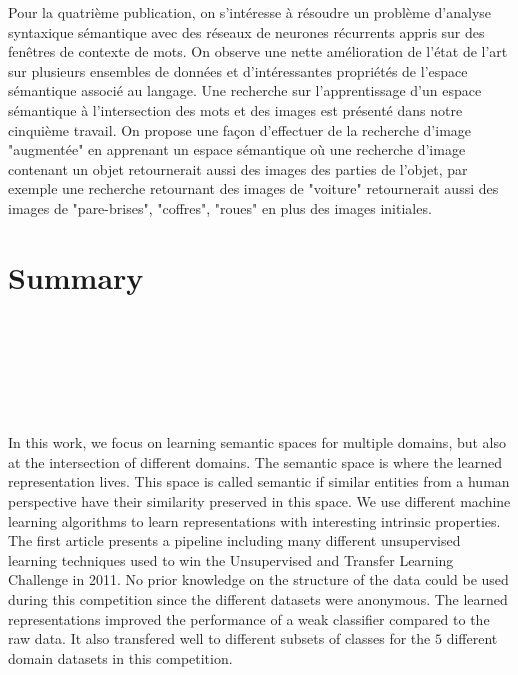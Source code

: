 \vspace{-0.2cm}
Pour la quatrième publication, on s'intéresse à résoudre un problème d'analyse
syntaxique sémantique avec des réseaux de neurones récurrents appris sur des
fenêtres de contexte de mots.  On observe une nette amélioration de l'état de
l'art sur plusieurs ensembles de données et d'intéressantes propriétés de
l'espace sémantique associé au langage.  Une recherche sur l'apprentissage d'un
espace sémantique à l'intersection des mots et des images est présenté dans
notre cinquième travail. On propose une façon d'effectuer de la recherche
d'image "augmentée" en apprenant un espace sémantique où une recherche d'image
contenant un objet retournerait aussi des images des parties de l'objet, par
exemple une recherche retournant des images de  "voiture" retournerait aussi
des images de "pare-brises", "coffres", "roues" en plus des images initiales.
 
\chapter*{Summary\\~~~~~~~~\\~~~~~~~~~~~\\~~~~~~~~~~}

\vspace{-3cm}

In this work, we focus on learning semantic spaces for multiple domains, but
also at the intersection of different domains. The semantic space is where the
learned representation lives. This space is called semantic if similar
entities from a human perspective have their similarity preserved in this
space.  We use different machine learning algorithms to learn representations
with interesting intrinsic properties. 
\\

\vspace{-0.2cm} The first article presents a pipeline including many different
unsupervised learning techniques used to win the Unsupervised and Transfer
Learning Challenge in 2011. No prior knowledge on the structure of the data
could be used during this competition since the different datasets were
anonymous. The learned representations improved the performance of a weak
classifier compared to the raw data. It also transfered well to different
subsets of classes for the $5$ different domain datasets in this competition.

